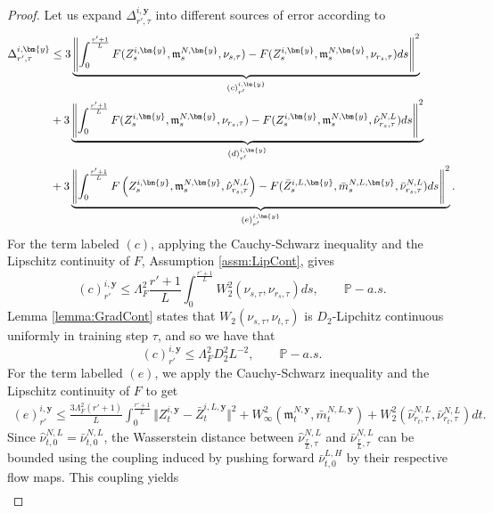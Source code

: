 \documentclass{article}
\begin{document}
\begin{appendices}
\begin{proof}
Let us expand $\Delta^{i,\bm{y}}_{r',\tau}$ into different sources of error according to
\begin{align}\label{eqn:AllErrors}
     \Delta^{i,\bm{y}}_{r',\tau}&\le 3\underbrace{\left\Vert \int_0^\frac{r'+1}{L} F(Z^{i,\bm{y}}_s,\mathfrak{m}^{N,\bm{y}}_s,\nu_{s,\tau})-F( Z^{i,\bm{y}}_s, \mathfrak{m}^{N,\bm{y}}_s,\nu_{r_s,\tau})ds\right\Vert^2}_{(c)^{i,\bm{y}}_{r'}}\\&+3\underbrace{\left\Vert \int_0^{\frac{r'+1}{L}} F( Z^{i,\bm{y}}_s, \mathfrak{m}^{N,\bm{y}}_s,\nu_{r_s,\tau})-F(Z^{i,\bm{y}}_s, \mathfrak{m}^{N,\bm{y}}_s,\hat\nu^{N,L}_{r_s,\tau})ds\right\Vert^2}_{(d)^{i,\bm{y}}_{r'}}\notag\\
     &+3\underbrace{\left\Vert \int_0^{\frac{r'+1}{L}} F\left( Z^{i,\bm{y}}_s,\mathfrak{m}^{N,\bm{y}}_s,\hat\nu^{N,L}_{r_s,\tau}\right)-F(\bar Z^{i,L,\bm{y}}_s,\bar m^{N,L,\bm{y}}_s,\bar\nu^{N,L}_{r_s,\tau})ds\right\Vert^2}_{(e)^{i,\bm{y}}_{r'}}\notag.
 \end{align}
 For the term labeled $(c)$, applying the Cauchy-Schwarz inequality and the Lipschitz continuity of $F$, Assumption \ref{assm:LipCont}, gives
 \begin{equation*}
     (c)^{i,\bm{y}}_{r'}\le \Lambda_F^2  \frac{r'+1}{L}\int_0^\frac{r'+1}{L}  W^2_2(\nu_{s,\tau},\nu_{r_s,\tau})ds, \qquad \mathbb P-a.s.
 \end{equation*}
 Lemma \ref{lemma:GradCont} states that $ W_2(\nu_{s,\tau},\nu_{t,\tau})$ is $D_2$-Lipchitz continuous uniformly in training step $\tau$, and so  we have that
\begin{equation}\label{eqn:(c)}
       (c)^{i,\bm{y}}_{r'}\le \Lambda_F^2 D_2^2L^{-2}, \qquad \mathbb P-a.s.
 \end{equation}
 For the term labelled $(e)$, we apply the Cauchy-Schwarz inequality and the Lipschitz continuity of $F$ to get
\begin{align*}
     (e)^{i,\bm{y}}_{r'}\le  \frac{3\Lambda_F^2(r'+1)}{L}\int_{0}^{\frac{r'+1}{L}} \Vert Z^{i,\bm{y}}_t-\bar Z^{i,L,\bm{y}}_{t}\Vert^2+ W_\infty^2\left(\mathfrak{m}^{N,\bm{y}}_t,\bar m^{N,L,\bm{y}}_t \right)+ W_2^2(\hat \nu^{N,L}_{r_t,\tau}, \bar \nu^{N,L}_{r_t,\tau})dt.
 \end{align*}
  Since $\hat \nu^{N,L}_{t,0}=\bar \nu^{N,L}_{t,0}$, the Wasserstein distance between $\hat \nu^{N,L}_{\frac{r}{L},\tau}$ and $ \bar \nu^{N,L}_{\frac{r}{L},\tau}$ can be bounded using the coupling induced by pushing forward $\bar \nu^{L,H}_{t,0}$ by their respective flow maps. This coupling yields
 \begin{align*}

\end{align*}
\end{proof}
\end{appendices}
\end{document}
